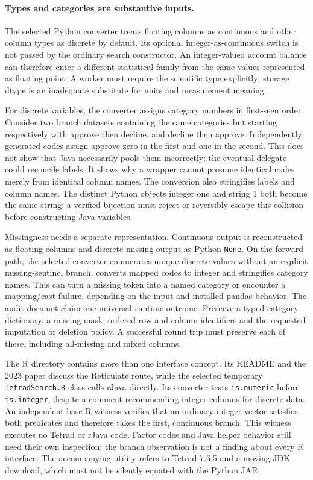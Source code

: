 \paragraph{Types and categories are substantive inputs.}
The selected Python converter treats floating columns as continuous and other
column types as discrete by default. Its optional integer-as-continuous switch
is not passed by the ordinary search constructor. An integer-valued account
balance can therefore enter a different statistical family from the same
values represented as floating point. A worker must require the scientific
type explicitly; storage dtype is an inadequate substitute for units and
measurement meaning.\citep{exec24_pytetrad_source}

For discrete variables, the converter assigns category numbers in first-seen
order. Consider two branch datasets containing the same categories but starting
respectively with approve then decline, and decline then approve. Independently
generated codes assign approve zero in the first and one in the second. This
does not show that Java necessarily pools them incorrectly: the eventual
delegate could reconcile labels. It shows why a wrapper cannot presume identical
codes merely from identical column names. The conversion also stringifies labels
and column names. The distinct Python objects integer one and string 1
both become the same string; a verified bijection must reject or reversibly
escape this collision before constructing Java variables.
\citep{exec24_pytetrad_source,exec24_pytetrad_choice}

Missingness needs a separate representation. Continuous output is reconstructed
as floating columns and discrete missing output as Python \texttt{None}. On
the forward path, the selected converter enumerates unique discrete values
without an explicit missing-sentinel branch, converts mapped codes to integer
and stringifies category names. This can turn a missing token into a named
category or encounter a mapping/cast failure, depending on the input and
installed pandas behavior. The audit does not claim one universal runtime
outcome. Preserve a typed category dictionary, a missing mask, ordered row and
column identifiers and the requested imputation or deletion policy. A successful
round trip must preserve each of these, including all-missing and mixed columns.
\citep{exec24_pytetrad_source}

The R directory contains more than one interface concept. Its README and the
2023 paper discuss the Reticulate route, while the selected temporary
\texttt{TetradSearch.R} class calls rJava directly. Its converter tests
\texttt{is.numeric} before \texttt{is.integer}, despite a comment recommending
integer columns for discrete data. An independent base-R witness verifies that
an ordinary integer vector satisfies both predicates and therefore takes the
first, continuous branch. This witness executes no Tetrad or rJava code.
Factor codes and Java helper behavior still need their own inspection; the
branch observation is not a finding about every R interface. The accompanying
utility refers to Tetrad 7.6.5 and a moving JDK download, which must not be
silently equated with the Python JAR.\citep{exec24_pytetrad_source,exec24_pytetrad_choice}

